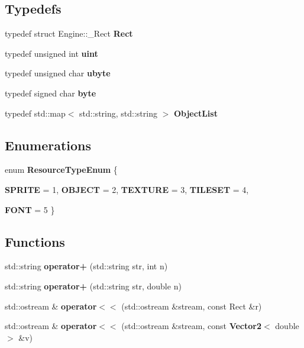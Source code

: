 \subsection*{Typedefs}
\begin{CompactItemize}
\item 
typedef struct Engine::\_\-Rect \textbf{Rect}\label{namespaceEngine_8b1b0ca80c78a2fa7a1f6ee44fd8d1b0}

\item 
typedef unsigned int \textbf{uint}\label{namespaceEngine_91ad9478d81a7aaf2593e8d9c3d06a14}

\item 
typedef unsigned char \textbf{ubyte}\label{namespaceEngine_5dd4f281954ce1405c92d62a427f839a}

\item 
typedef signed char \textbf{byte}\label{namespaceEngine_331be856ee819bee7ec068d1236a3007}

\item 
typedef std::map$<$ std::string, std::string $>$ \textbf{ObjectList}\label{namespaceEngine_d015889b2f2c0fc8ecda611086d1c21f}

\end{CompactItemize}
\subsection*{Enumerations}
\begin{CompactItemize}
\item 
enum \textbf{ResourceTypeEnum} \{ \par
\textbf{SPRITE} =  1, 
\textbf{OBJECT} =  2, 
\textbf{TEXTURE} =  3, 
\textbf{TILESET} =  4, 
\par
\textbf{FONT} =  5
 \}
\end{CompactItemize}
\subsection*{Functions}
\begin{CompactItemize}
\item 
std::string {\bf operator+} (std::string str, int n)
\item 
std::string {\bf operator+} (std::string str, double n)
\item 
std::ostream \& \textbf{operator$<$$<$} (std::ostream \&stream, const Rect \&r)\label{namespaceEngine_bf48288926613bd8be415ebd56d021d5}

\item 
std::ostream \& \textbf{operator$<$$<$} (std::ostream \&stream, const {\bf Vector2}$<$ double $>$ \&v)\label{namespaceEngine_9838854e262b5193014b9c1870e5265d}

\end{CompactItemize}


